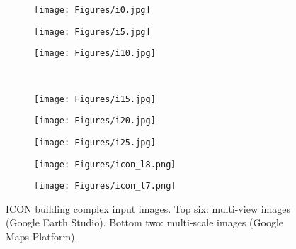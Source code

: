 
\begin{figure}[h]
\vspace{-6.5cm}
    \centering
    \begin{subfigure}{0.15\textwidth}
        \texttt{[image: Figures/i0.jpg]} 
    \end{subfigure}
    \begin{subfigure}{0.15\textwidth}
        \texttt{[image: Figures/i5.jpg]}
    \end{subfigure}
    \begin{subfigure}{0.15\textwidth}
        \texttt{[image: Figures/i10.jpg]}
    \end{subfigure}
    \\
    \begin{subfigure}{0.15\textwidth}
        \texttt{[image: Figures/i15.jpg]}
    \end{subfigure}
    \begin{subfigure}{0.15\textwidth}
        \texttt{[image: Figures/i20.jpg]}
    \end{subfigure}
    \begin{subfigure}{0.15\textwidth}
        \texttt{[image: Figures/i25.jpg]}
    \end{subfigure}
    \begin{subfigure}{0.15\textwidth}
    \vspace{0.2cm}
        \texttt{[image: Figures/icon\_l8.png]}
    \end{subfigure}
    \hspace{0.015\textwidth}
    \begin{subfigure}{0.15\textwidth}
        \texttt{[image: Figures/icon\_l7.png]}
    \end{subfigure}

    \caption{ICON building complex input images. Top six: multi-view images (Google Earth Studio). Bottom two: multi-scale images (Google Maps Platform).}
    \label{fig:icon}
\end{figure}